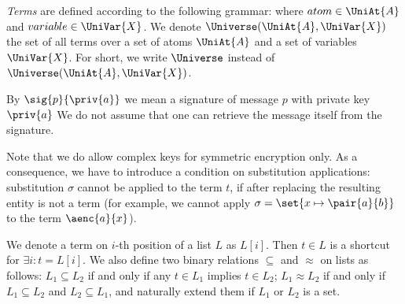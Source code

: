 \begin{df}\label{def:term}
\emph{Terms}  are defined according to the following grammar:
where
$atom \in \UniAt{A}$ and
$variable \in \UniVar{X}$.
 We denote $\Universe(\UniAt{A},\UniVar{X})$ the set of all terms over 
a set of atoms $\UniAt{A}$ and a set of variables $\UniVar{X}$. 
For short, we write $\Universe$ instead of $\Universe(\UniAt{A},\UniVar{X})$.

\end{df}

By $\sig{p}{\priv{a}}$ we mean a signature of message $p$ with private key $\priv{a}$ 
We do not assume that one can retrieve the  message itself from the signature.

Note that we do allow complex keys for symmetric encryption only.
As a consequence, we have to introduce a condition on substitution applications: 
substitution $\sigma$ cannot be applied to the term $t$, if after replacing the resulting entity is not a term 
(for example, we cannot apply $\sigma=\set{x\mapsto \pair{a}{b}}$ to the term $\aenc{a}{x}$).




We denote a term on $i$-th position of a list $L$ as $L[i]$. 
Then $t\in L$ is a shortcut for $\exists i: t = L[i]$. 
We also define two binary relations $\subseteq$ and $\approx$ on lists as follows:
$L_1\subseteq L_2$ if and only if  any $t\in L_1$ implies  $t\in L_2$;
$L_1 \approx L_2$ if and only if $L_1 \subseteq L_2$ and $L_2 \subseteq L_1$,
and naturally extend them if $L_1$ or $L_2$ is a set. 

